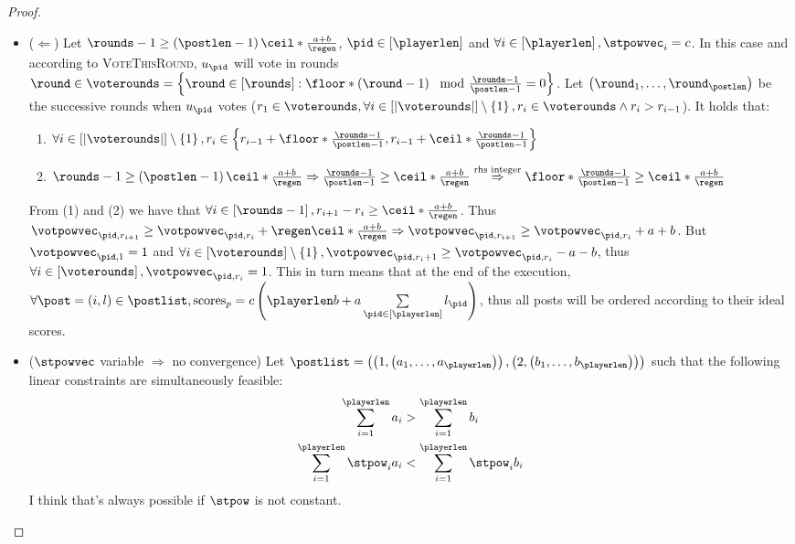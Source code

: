 \begin{proof}
  \begin{itemize}
    \item ($\Leftarrow$) Let $\rounds - 1 \geq \left(\postlen -
    1\right)\ceil*{\frac{a+b}{\regen}}$, $\pid \in \left[\playerlen\right]$ and
    $\forall i \in \left[\playerlen\right], \stpowvec_i = c$. In this case and
    according to \textsc{VoteThisRound}, $u_{\pid}$ will vote in rounds $\round
    \in \voterounds = \left\{\round \in \left[\rounds\right] :
    \floor*{\left(\round - 1\right) \mod \frac{\rounds - 1}{\postlen - 1}} =
    0\right\}$. Let $\left(\round_1, \dots, \round_\postlen\right)$ be the
    successive rounds when $u_{\pid}$ votes ($r_1 \in \voterounds, \forall i \in
    \left[|\voterounds|\right] \setminus \left\{1\right\}, r_i \in \voterounds
    \wedge r_i > r_{i - 1}$). It holds that:
    \begin{enumerate}
      \item $\forall i \in \left[|\voterounds|\right] \setminus
      \left\{1\right\}, r_i \in \left\{r_{i - 1} + \floor*{\frac{\rounds -
      1}{\postlen - 1}}, r_{i - 1} + \ceil*{\frac{\rounds - 1}{\postlen -
      1}}\right\}$

      \item $\rounds - 1 \geq \left(\postlen -
      1\right)\ceil*{\frac{a+b}{\regen}} \Rightarrow \frac{\rounds - 1}{\postlen
      - 1} \geq \ceil*{\frac{a+b}{\regen}} \overset{\text{rhs
      integer}}{\Rightarrow} \floor*{\frac{\rounds - 1}{\postlen - 1}} \geq
      \ceil*{\frac{a+b}{\regen}}$
    \end{enumerate}
    From (1) and (2) we have that $\forall i \in \left[\rounds - 1\right],
    r_{i+1} - r_i \geq \ceil*{\frac{a+b}{\regen}}$. Thus $\votpowvec_{\pid, r_{i
    + 1}} \geq \votpowvec_{\pid, r_i} + \regen\ceil*{\frac{a+b}{\regen}}
    \Rightarrow \votpowvec_{\pid, r_{i + 1}} \geq \votpowvec_{\pid, r_i} + a +
    b$. But $\votpowvec_{\pid, 1} = 1$ and $\forall i \in
    \left[\voterounds\right] \setminus \left\{1\right\}, \votpowvec_{\pid, r_i
    + 1} \geq \votpowvec_{\pid, r_i} - a - b$, thus $\forall i \in
    \left[\voterounds\right], \votpowvec_{\pid, r_i} = 1$. This in turn means
    that at the end of the execution, $\forall \post = \left(i, l\right) \in \postlist,
    \mathrm{scores}_{p} = c\left(\playerlen b + a \sum\limits_{\pid \in
    \left[\playerlen\right]} l_{\pid}\right)$, thus all posts will be ordered
    according to their ideal scores.

    \item ($\stpowvec$ variable $\Rightarrow$ no convergence) Let $\postlist =
    \left(\left(1, \left(a_1, \dots, a_\playerlen\right)\right), \left(2,
    \left(b_1, \dots, b_\playerlen\right)\right)\right)$ such that the following
    linear constraints are simultaneously feasible:
    \begin{gather*}
      \sum\limits_{i=1}^\playerlen a_i > \sum\limits_{i=1}^\playerlen b_i \\
      \sum\limits_{i=1}^\playerlen \stpow_i a_i < \sum\limits_{i=1}^\playerlen
      \stpow_i  b_i
    \end{gather*}
    I think that's always possible if $\stpow$ is not constant.


\end{itemize}
\end{proof}
